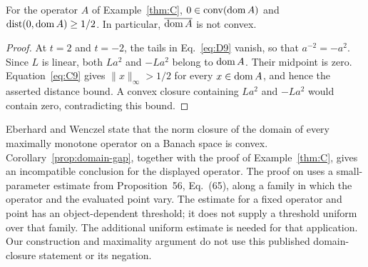 \begin{corollary}\label{prop:domain-gap}
For the operator $A$ of Example~\ref{thm:C},
$0\in\operatorname{conv}(\operatorname{dom} A)$ and
$\operatorname{dist}(0,\operatorname{dom} A)\ge1/2$.
In particular, $\overline{\operatorname{dom} A}$ is not convex.
\end{corollary}
\begin{proof}
At $t=2$ and $t=-2$, the tails in Eq.~\eqref{eq:D9} vanish, so that
$a^{-2}=-a^2$. Since $L$ is linear, both $La^2$ and $-La^2$ belong
to $\operatorname{dom} A$. Their midpoint is zero. Equation~\eqref{eq:C9} gives
$\|x\|_\infty>1/2$ for every $x\in\operatorname{dom} A$, and hence the asserted
distance bound. A convex closure containing $La^2$ and $-La^2$ would
contain zero, contradicting this bound.
\end{proof}

\begin{remark}
Eberhard and Wenczel \cite[Theorem~57]{eberhardwenczel2024} state that
the norm closure of the domain of every maximally monotone operator on
a Banach space is convex. Corollary~\ref{prop:domain-gap}, together
with the proof of Example~\ref{thm:C}, gives an incompatible
conclusion for the displayed operator. The proof on
\cite[pp.~39--40]{eberhardwenczel2024} uses a small-parameter estimate
from Proposition~56, Eq.~(65), along a family in which the operator and
the evaluated point vary. The estimate for a fixed operator and point
has an object-dependent threshold; it does not supply a threshold
uniform over that family. The additional uniform estimate is needed
for that application. Our construction and maximality argument do not
use this published domain-closure statement or its negation.
\end{remark}

